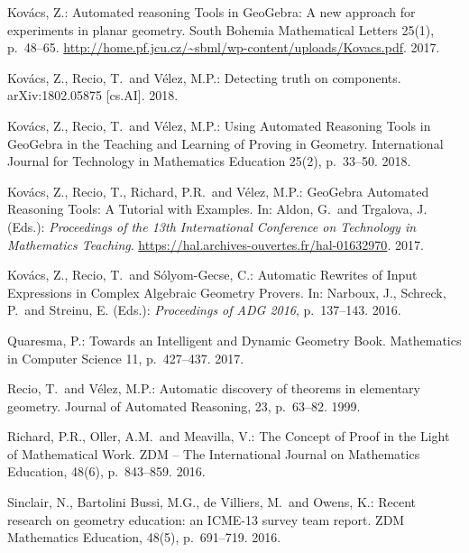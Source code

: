 \begin{thebibliography}{10}
Kov\'acs, Z.: Automated reasoning Tools in GeoGebra:
A new approach for experiments in planar geometry.
South Bohemia Mathematical Letters 25(1), p.~48--65.
\url{http://home.pf.jcu.cz/~sbml/wp-content/uploads/Kovacs.pdf}. 2017.

Kov\'acs, Z., Recio, T.~and V\'elez, M.P.:
Detecting truth on components. arXiv:1802.05875 [cs.AI]. 2018.

Kov\'acs, Z., Recio, T.~and V\'elez, M.P.:
Using Automated Reasoning Tools in GeoGebra in the Teaching and Learning of Proving in Geometry.
International Journal for Technology in Mathematics Education 25(2), p.~33--50. 2018.

Kov\'acs, Z., Recio, T., Richard, P.R.~and V\'elez, M.P.: GeoGebra Automated
Reasoning Tools: A Tutorial with Examples. In: Aldon, G.~and Trgalova, J. (Eds.):
\textit{Proceedings of the 13th International
Conference on Technology in Mathematics Teaching}.
\url{https://hal.archives-ouvertes.fr/hal-01632970}. 2017.

Kov\'acs, Z., Recio, T.~and S\'olyom-Gecse, C.:
Automatic Rewrites of Input Expressions in Complex Algebraic Geometry Provers.
In: Narboux, J., Schreck, P.~and Streinu, E. (Eds.): \textit{Proceedings of ADG 2016}, p.~137--143. 2016.

Quaresma, P.: Towards an Intelligent and Dynamic Geometry Book.
Mathematics in Computer Science 11, p.~427--437. 2017.

Recio, T.~and V\'elez, M.P.:
Automatic discovery of theorems in elementary geometry.
Journal of Automated Reasoning, 23, p.~63--82.
1999.

Richard, P.R., Oller, A.M.~and Meavilla, V.:
The Concept of Proof in the Light of Mathematical Work.
ZDM -- The International Journal on Mathematics Education, 48(6), p.~843--859. 2016.

Sinclair, N., Bartolini Bussi, M.G., de Villiers, M.~and Owens, K.:
Recent research on geometry education: an ICME-13 survey team report.
ZDM Mathematics Education, 48(5), p.~691--719. 2016.


\end{thebibliography}
